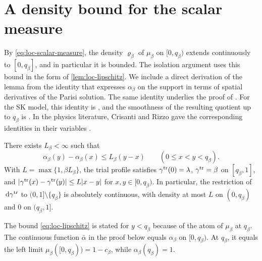 \section{A density bound for the scalar measure}

By \eqref{eq:loc-scalar-measure}, the density $\varrho_\beta$ of $\mu_\beta$
on $[0,q_\beta)$ extends continuously to $[0,q_\beta]$, and in particular it
is bounded. The isolation argument uses this bound in the form of
\cref{lem:loc-lipschitz}. We include a direct derivation of the lemma from the
identity
that expresses $\alpha_\beta$ on the support in terms of spatial derivatives
of the Parisi solution. The same identity underlies the proof of
\cite[Theorem~2(ii)]{AuffingerChen2015Properties}. For the SK model, this
identity is \cite[Lemma~6.2, (6.1)]{Lopatto}, and the smoothness of the
resulting quotient up to $q_\beta$ is \cite[Lemma~6.3]{Lopatto}. In the physics
literature, Crisanti and Rizzo gave the corresponding identities in their
variables \cite[Eqs.~(22)--(23)]{CrisantiRizzo2002}.

\begin{lemma}\label{lem:loc-lipschitz}
There exists $L_\beta<\infty$ such that
\begin{equation}\label{eq:loc-lipschitz}
 \alpha_\beta(y)-\alpha_\beta(x)\le L_\beta(y-x)
 \qquad(0\le x<y<q_\beta).
\end{equation}
With $L=\max\{1,\beta L_\beta\}$, the trial profile satisfies
$\gamma^{\rm tr}(0)=\lambda$, $\gamma^{\rm tr}=\beta$ on $[q_\beta,1]$, and
$|\gamma^{\rm tr}(x)-\gamma^{\rm tr}(y)|\le L|x-y|$ for $x,y\in[0,q_\beta)$. In
particular, the restriction of $\,\mathrm d\gamma^{\rm tr}$ to
$(0,1]\setminus\{q_\beta\}$ is absolutely continuous, with density at most $L$
on $(0,q_\beta)$ and $0$ on $(q_\beta,1]$.
\end{lemma}

The bound \eqref{eq:loc-lipschitz} is stated for $y<q_\beta$ because of the
atom of $\mu_\beta$ at $q_\beta$. The continuous function $\bar\alpha$ in the
proof below equals $\alpha_\beta$ on $[0,q_\beta)$. At $q_\beta$, it equals
the left limit $\mu_\beta([0,q_\beta))=1-c_\beta$, while
$\alpha_\beta(q_\beta)=1$.


